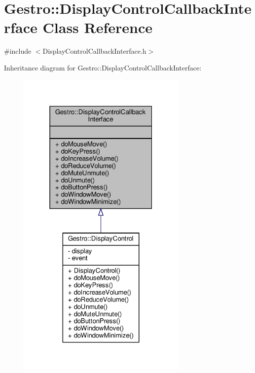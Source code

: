 \hypertarget{class_gestro_1_1_display_control_callback_interface}{}\section{Gestro\+:\+:Display\+Control\+Callback\+Interface Class Reference}
\label{class_gestro_1_1_display_control_callback_interface}


{\ttfamily \#include $<$Display\+Control\+Callback\+Interface.\+h$>$}



Inheritance diagram for Gestro\+:\+:Display\+Control\+Callback\+Interface\+:
\nopagebreak
\begin{figure}[H]
\begin{center}
\leavevmode
\includegraphics[width=235pt]{class_gestro_1_1_display_control_callback_interface__inherit__graph}
\end{center}
\end{figure}


